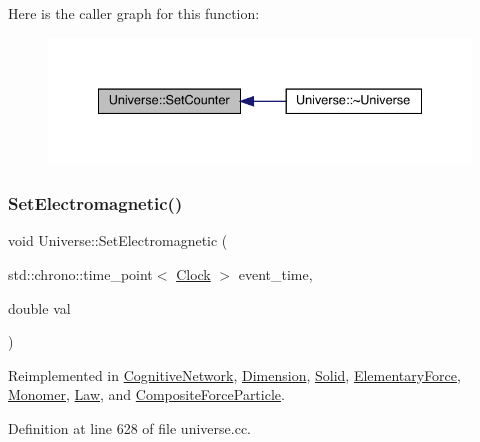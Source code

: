 Here is the caller graph for this function\+:
\nopagebreak
\begin{figure}[H]
\begin{center}
\leavevmode
\includegraphics[width=335pt]{class_universe_aa22202ae740eb1355529afcb13285e91_icgraph}
\end{center}
\end{figure}
\mbox{\label{class_universe_aa981fc7e252b1fbbb675f0371860954d}} 
\subsubsection{\texorpdfstring{Set\+Electromagnetic()}{SetElectromagnetic()}}
{\footnotesize\ttfamily void Universe\+::\+Set\+Electromagnetic (\begin{DoxyParamCaption}\item[{std\+::chrono\+::time\+\_\+point$<$ \hyperlink{universe_8h_a0ef8d951d1ca5ab3cfaf7ab4c7a6fd80}{Clock} $>$}]{event\+\_\+time,  }\item[{double}]{val }\end{DoxyParamCaption})\hspace{0.3cm}{\ttfamily [virtual]}}



Reimplemented in \hyperlink{class_cognitive_network_a31764cd5746369d16b45f2ff74806a0b}{Cognitive\+Network}, \hyperlink{class_dimension_ad8c18ce6358904e01594092dca9f1311}{Dimension}, \hyperlink{class_solid_a9a660f9d94f597712c67922aa1d4d795}{Solid}, \hyperlink{class_elementary_force_a67f6845bd715c29c17387d291b343a1b}{Elementary\+Force}, \hyperlink{class_monomer_a50e41be601b31450a97bfd15950cfb3d}{Monomer}, \hyperlink{class_law_acabe1a3113c207368f3bb6fe81e13963}{Law}, and \hyperlink{class_composite_force_particle_a476c0d570c3be75c9e186df1ec2a5cda}{Composite\+Force\+Particle}.



Definition at line 628 of file universe.\+cc.

